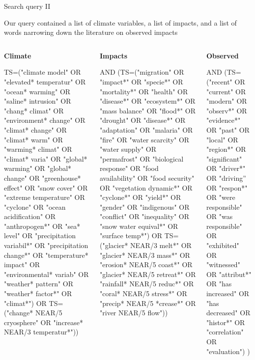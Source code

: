 \documentclass[9pt]{beamer}
\begin{document}
\begin{frame}{Search query II}

Our query contained a list of climate variables, a list of impacts, and a list of words narrowing down the literature on observed impacts

\begin{columns}
\begin{column}{0.33\linewidth}
\textbf{Climate}

\scriptsize

TS=("climate model" OR "elevated* temperatur" OR "ocean* warming" OR "saline* intrusion" OR "chang* climat" OR "environment* change" OR "climat* change" OR "climat* warm" OR "warming* climat" OR "climat* varia" OR "global* warming" OR "global* change" OR "greenhouse* effect" OR "snow cover" OR "extreme temperature" OR "cyclone" OR "ocean acidification" OR "anthropogen*" OR "sea* level" OR "precipitation variabil*" OR "precipitation change*" OR "temperature* impact" OR "environmental* variab" OR "weather* pattern" OR "weather* factor*" OR "climat*") OR TS=("change* NEAR/5 cryosphere" OR "increase* NEAR/3 temperatur*")) 

\end{column}
\begin{column}{0.33\linewidth}

\textbf{Impacts}

\scriptsize

AND (TS=("migration" OR "impact*" OR "specie*" OR "mortality*" OR "health" OR "disease*" OR "ecosystem*" OR "mass balance" OR "flood*" OR "drought" OR "disease*" OR "adaptation" OR "malaria" OR "fire" OR "water scarcity" OR "water supply" OR "permafrost" OR "biological response" OR "food availability" OR "food security" OR "vegetation dynamic*" OR "cyclone*" OR "yield*" OR "gender" OR "indigenous" OR "conflict" OR "inequality" OR "snow water equival*" OR "surface temp*") OR TS=("glacier* NEAR/3 melt*" OR "glacier* NEAR/3 mass*" OR "erosion* NEAR/5 coast*" OR "glacier* NEAR/5 retreat*" OR "rainfall* NEAR/5 reduc*" OR "coral* NEAR/5 stress*" OR "precip* NEAR/5 *crease*" OR "river NEAR/5 flow"))

\end{column}
\begin{column}{0.33\linewidth}

\textbf{Observed}

\scriptsize

AND (TS=("recent" OR "current" OR "modern" OR "observ*" OR "evidence*" OR "past" OR "local" OR "region*" OR "significant" OR "driver*" OR "driving” OR "respon*" OR "were responsible" OR "was responsible" OR "exhibited" OR "witnessed" OR "attribut*" OR "has increased" OR "has decreased" OR "histor*" OR "correlation" OR "evaluation") )
\end{column}	
\end{columns}

\end{frame}
\end{document}
